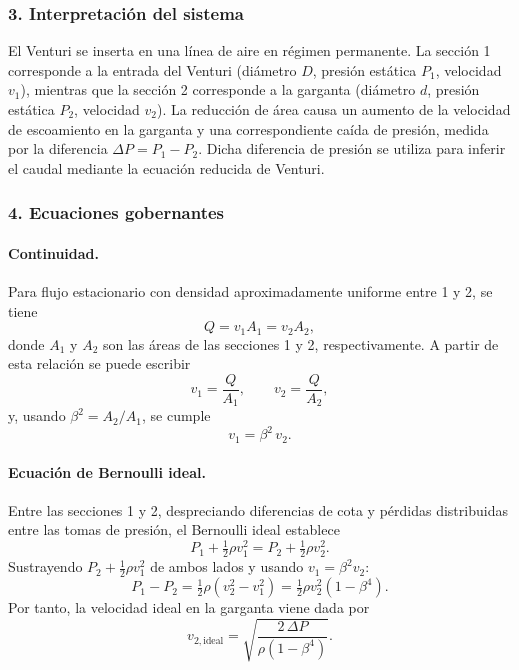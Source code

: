 \documentclass[12pt, a4paper]{article}
\begin{document}
\subsubsection*{3. Interpretación del sistema}

El Venturi se inserta en una línea de aire en régimen permanente. La sección 1 corresponde 
a la entrada del Venturi (diámetro $D$, presión estática $P_1$, velocidad $v_1$), mientras
que la sección 2 corresponde a la garganta (diámetro $d$, presión estática $P_2$, 
velocidad $v_2$). La reducción de área causa un aumento de la velocidad de escoamiento 
en la garganta y una correspondiente caída de presión, medida por la diferencia 
$\Delta P = P_1 - P_2$. Dicha diferencia de presión se utiliza para inferir el caudal 
mediante la ecuación reducida de Venturi.

\subsubsection*{4. Ecuaciones gobernantes}

\paragraph{Continuidad.}
Para flujo estacionario con densidad aproximadamente uniforme entre 1 y 2, se tiene
\[
Q = v_1 A_1 = v_2 A_2,
\]
donde $A_1$ y $A_2$ son las áreas de las secciones 1 y 2, respectivamente. A partir de 
esta relación se puede escribir
\[
v_1 = \frac{Q}{A_1},\qquad v_2 = \frac{Q}{A_2}, 
\]
y, usando $\beta^2 = A_2/A_1$, se cumple
\[
v_1 = \beta^2\,v_2.
\]

\paragraph{Ecuación de Bernoulli ideal.}
Entre las secciones 1 y 2, despreciando diferencias de cota y pérdidas distribuidas entre 
las tomas de presión, el Bernoulli ideal establece
\[
P_1 + \tfrac{1}{2}\rho v_1^2 = P_2 + \tfrac{1}{2}\rho v_2^2.
\]
Sustrayendo $P_2 + \tfrac{1}{2}\rho v_1^2$ de ambos lados y usando $v_1 = \beta^2 v_2$:
\[
P_1 - P_2 = \tfrac{1}{2}\rho\left(v_2^2 - v_1^2\right)
          = \tfrac{1}{2}\rho v_2^2 \left(1 - \beta^4\right).
\]
Por tanto, la velocidad ideal en la garganta viene dada por
\[
v_{2,\text{ideal}} = \sqrt{\frac{2\,\Delta P}{\rho(1-\beta^4)}}.
\]
\end{document}
